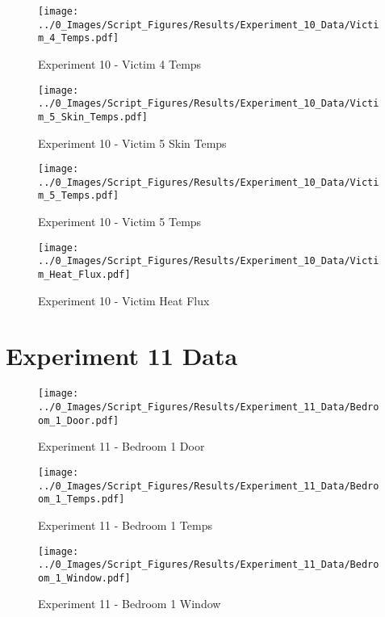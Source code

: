 	\clearpage

	\begin{figure}[H]
		\centering
		\texttt{[image: ../0\_Images/Script\_Figures/Results/Experiment\_10\_Data/Victim\_4\_Temps.pdf]}
		\caption[]{Experiment 10 - Victim 4 Temps}
	\end{figure}
 

	\begin{figure}[H]
		\centering
		\texttt{[image: ../0\_Images/Script\_Figures/Results/Experiment\_10\_Data/Victim\_5\_Skin\_Temps.pdf]}
		\caption[]{Experiment 10 - Victim 5 Skin Temps}
	\end{figure}
 
	\clearpage

	\begin{figure}[H]
		\centering
		\texttt{[image: ../0\_Images/Script\_Figures/Results/Experiment\_10\_Data/Victim\_5\_Temps.pdf]}
		\caption[]{Experiment 10 - Victim 5 Temps}
	\end{figure}
 

	\begin{figure}[H]
		\centering
		\texttt{[image: ../0\_Images/Script\_Figures/Results/Experiment\_10\_Data/Victim\_Heat\_Flux.pdf]}
		\caption[]{Experiment 10 - Victim Heat Flux}
	\end{figure}
 
	\clearpage

\clearpage		\large
\section{Experiment 11 Data} \label{App:Exp11Results} 

	\begin{figure}[H]
		\centering
		\texttt{[image: ../0\_Images/Script\_Figures/Results/Experiment\_11\_Data/Bedroom\_1\_Door.pdf]}
		\caption[]{Experiment 11 - Bedroom 1 Door}
	\end{figure}
 

	\begin{figure}[H]
		\centering
		\texttt{[image: ../0\_Images/Script\_Figures/Results/Experiment\_11\_Data/Bedroom\_1\_Temps.pdf]}
		\caption[]{Experiment 11 - Bedroom 1 Temps}
	\end{figure}
 
	\clearpage

	\begin{figure}[H]
		\centering
		\texttt{[image: ../0\_Images/Script\_Figures/Results/Experiment\_11\_Data/Bedroom\_1\_Window.pdf]}
		\caption[]{Experiment 11 - Bedroom 1 Window}
	\end{figure}
 

